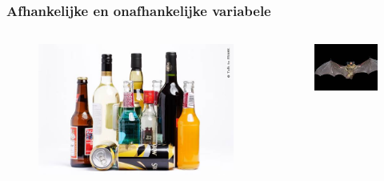 \documentclass{beamer}
\begin{document}
\begin{frame}
  \frametitle{Afhankelijke en onafhankelijke variabele}
  \begin{columns}
    \begin{column}{0.3\textwidth}

      \begin{figure}
        \centering
        \includegraphics[width=1.00\textwidth]{img/liquor.jpg}
        \label{fig:liquor}
      \end{figure}

    \end{column}
    \begin{column}{0.3\textwidth}

      \begin{figure}
        \centering
        \includegraphics[width=1.00\textwidth]{img/bat.jpg}
        \label{fig:bat}
      \end{figure}


\end{column}
\end{columns}
\end{frame}
\end{document}
